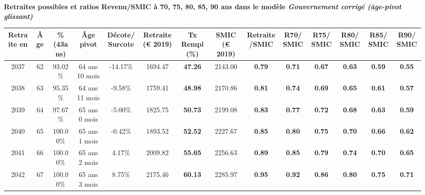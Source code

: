  \vspace{0.1cm} 
{\bf \noindent Retraites possibles et ratios Revenu/SMIC à 70, 75, 80, 85, 90 ans dans le modèle \emph{Gouvernement corrigé (âge-pivot glissant)}}  
 
\begin{adjustbox}{max width=\textwidth} 
\begin{tabular}[htb]{|c|c||c|c|c||c|c||c|c||c|c|c|c|c|} 
\hline 
 Retraite en &  Âge &  \%(43ans) &  Âge pivot &  Décote/Surcote &  Retraite (\euro{} 2019) &  Tx Rempl(\%) &  SMIC (\euro{} 2019) &  Retraite/SMIC &  R70/SMIC &  R75/SMIC &  R80/SMIC &  R85/SMIC &  R90/SMIC \\ 
\hline \hline 
 2037 &  62 &  93.02\% &  64 ans 10 mois &  -14.17\% &  1694.47 &  {\bf 47.26} &  2143.00 &  {\bf {\color{red} 0.79}} &  {\bf {\color{red} 0.71}} &  {\bf {\color{red} 0.67}} &  {\bf {\color{red} 0.63}} &  {\bf {\color{red} 0.59}} &  {\bf {\color{red} 0.55}} \\ 
\hline 
 2038 &  63 &  95.35\% &  64 ans 11 mois &  -9.58\% &  1759.41 &  {\bf 48.98} &  2170.86 &  {\bf {\color{red} 0.81}} &  {\bf {\color{red} 0.74}} &  {\bf {\color{red} 0.69}} &  {\bf {\color{red} 0.65}} &  {\bf {\color{red} 0.61}} &  {\bf {\color{red} 0.57}} \\ 
\hline 
 2039 &  64 &  97.67\% &  65 ans 0 mois &  -5.00\% &  1825.75 &  {\bf 50.73} &  2199.08 &  {\bf {\color{red} 0.83}} &  {\bf {\color{red} 0.77}} &  {\bf {\color{red} 0.72}} &  {\bf {\color{red} 0.68}} &  {\bf {\color{red} 0.63}} &  {\bf {\color{red} 0.59}} \\ 
\hline 
 2040 &  65 &  100.00\% &  65 ans 1 mois &  -0.42\% &  1893.52 &  {\bf 52.52} &  2227.67 &  {\bf {\color{red} 0.85}} &  {\bf {\color{red} 0.80}} &  {\bf {\color{red} 0.75}} &  {\bf {\color{red} 0.70}} &  {\bf {\color{red} 0.66}} &  {\bf {\color{red} 0.62}} \\ 
\hline 
 2041 &  66 &  100.00\% &  65 ans 2 mois &  4.17\% &  2009.82 &  {\bf 55.65} &  2256.63 &  {\bf {\color{red} 0.89}} &  {\bf {\color{red} 0.85}} &  {\bf {\color{red} 0.79}} &  {\bf {\color{red} 0.74}} &  {\bf {\color{red} 0.70}} &  {\bf {\color{red} 0.65}} \\ 
\hline 
 2042 &  67 &  100.00\% &  65 ans 3 mois &  8.75\% &  2175.46 &  {\bf 60.13} &  2285.97 &  {\bf {\color{red} 0.95}} &  {\bf {\color{red} 0.92}} &  {\bf {\color{red} 0.86}} &  {\bf {\color{red} 0.80}} &  {\bf {\color{red} 0.75}} &  {\bf {\color{red} 0.71}} \\ 
\hline 
\hline 
\end{tabular} 
\end{adjustbox} 
 
